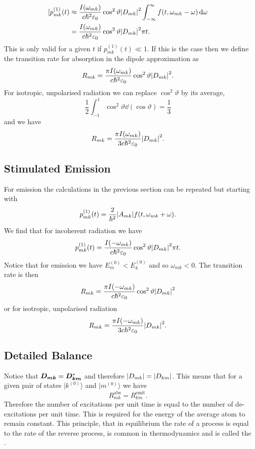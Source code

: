 \documentclass[a4paper]{article}
\renewcommand{\ket}[1]{\vert {#1} \rangle}
\begin{document}
    \begin{align*}
        [p_{mk}^{(1)}(t) &\approx \frac{I(\omega_{mk})}{c\hbar^2\varepsilon_0} \cos^2\vartheta\abs{D_{mk}}^2 \int_{-\infty}^{\infty} f(t, \omega_{mk} - \omega)\dd{\omega}\\
        &= \frac{I(\omega_{mk})}{c\hbar^2\varepsilon_0} \cos^2\vartheta \abs{D_{mk}}^2\pi t.
    \end{align*}
    This is only valid for a given \(t\) if \(p_{mk}^{(1)}(t) \ll 1\).
    If this is the case then we define the transition rate for absorption in the dipole approximation as
    \[R_{mk} = \frac{\pi I(\omega_{mk})}{c\hbar^2\varepsilon_0}\cos^2\vartheta\abs{D_{mk}}^2.\]
    For isotropic, unpolarised radiation we can replace \(\cos^2\vartheta\) by its average,
    \[\frac{1}{2}\int_{-1}^{1}\cos^2\vartheta\dd{(\cos\vartheta)} = \frac{1}{3}\]
    and we have
    \[R_{mk} = \frac{\pi I(\omega_{mk})}{3c\hbar^2\varepsilon_0}\abs{D_{mk}}^2.\]
    
    \subsection{Stimulated Emission}
    For emission the calculations in the previous section can be repeated but starting with
    \[p_{mk}^{(1)}(t) = \frac{2}{\hbar^2} \abs{A_{mk}}f(t, \omega_{mk} + \omega).\]
    We find that for incoherent radiation we have
    \[p_{mk}^{(1)}(t) = \frac{I(-\omega_{mk})}{c\hbar^2\varepsilon_0} \cos^2\vartheta \abs{D_{mk}}^2\pi t.\]
    Notice that for emission we have \(E_{m}^{(0)} < E_k^{(0)}\) and so \(\omega_{mk} < 0\).
    The transition rate is then
    \[R_{mk} = \frac{\pi I(-\omega_{mk})}{c\hbar^2\varepsilon_0}\cos^2\vartheta \abs{D_{mk}}^2\]
    or for isotropic, unpolarised radiation
    \[R_{mk} = \frac{\pi I(-\omega_{mk})}{3c\hbar^2\varepsilon_0}\abs{D_{mk}}^2.\]
    
    \subsection{Detailed Balance}
    Notice that \(\bm{D_{mk}} = \bm{D_{km}}^*\) and therefore \(\abs{D_{mk}} = \abs{D_{km}}\).
    This means that for a given pair of states \(\ket{k^{(0)}}\) and \(\ket{m^{(0)}}\) we have
    \[R_{mk}^{\mathrm{abs}} = R_{km}^{\mathrm{emit}}.\]
    Therefore the number of excitations per unit time is equal to the number of de-excitations per unit time.
    This is required for the energy of the average atom to remain constant.
    This principle, that in equilibrium the rate of a process is equal to the rate of the reverse process, is common in thermodynamics and is called the .
    
\end{document}
